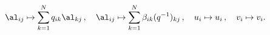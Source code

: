 \begin{equation}
\al_{ij} \mapsto \sum_{k=1}^N q_{ik}\al_{kj}\,, \quad
\al_{ij} \mapsto \sum_{k=1}^N \beta_{ik} (q^{-1})_{kj}\,, \quad
u_i \mapsto u_i\,, \quad
v_i \mapsto v_i.
\label{Parabol}
\end{equation}

